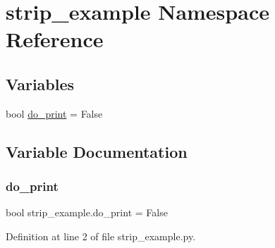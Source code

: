\hypertarget{namespacestrip__example}{}\section{strip\+\_\+example Namespace Reference}
\label{namespacestrip__example}
\subsection*{Variables}
\begin{DoxyCompactItemize}
\item 
bool \mbox{\hyperlink{namespacestrip__example_a9fff99ba5b5564a70fa48b9757ef9885}{do\+\_\+print}} = False
\end{DoxyCompactItemize}


\subsection{Variable Documentation}
\mbox{\label{namespacestrip__example_a9fff99ba5b5564a70fa48b9757ef9885}} 
\subsubsection{\texorpdfstring{do\_print}{do\_print}}
{\footnotesize\ttfamily bool strip\+\_\+example.\+do\+\_\+print = False}



Definition at line 2 of file strip\+\_\+example.\+py.

